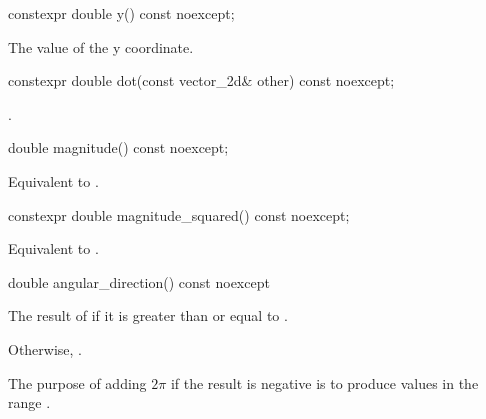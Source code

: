 \begin{itemdecl}
constexpr double y() const noexcept;
\end{itemdecl}
\begin{itemdescr}
\pnum
\returns
The value of the y coordinate.
\end{itemdescr}

\begin{itemdecl}
constexpr double dot(const vector_2d& other) const noexcept;
\end{itemdecl}
\begin{itemdescr}
\pnum
\returns
{}.
\end{itemdescr}

\begin{itemdecl}
    double magnitude() const noexcept;
\end{itemdecl}
\begin{itemdescr}
\pnum
\returns
Equivalent to .
\end{itemdescr}

\begin{itemdecl}
constexpr double magnitude_squared() const noexcept;
\end{itemdecl}
\begin{itemdescr}
\pnum
\returns
Equivalent to .
\end{itemdescr}

\begin{itemdecl}
double angular_direction() const noexcept
\end{itemdecl}
\begin{itemdescr}
\pnum
\returns
The result of  if it is greater than or equal to .

\pnum
Otherwise, . 

\pnum
\realnotes
The purpose of adding $2\pi$ if the result is negative is to produce values in the range .
\end{itemdescr}

